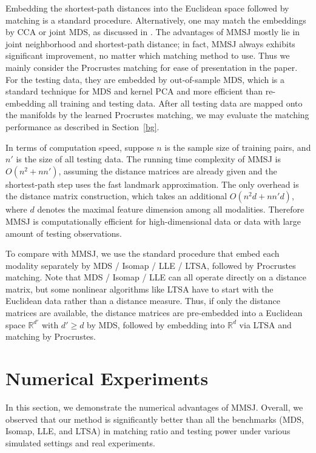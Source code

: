 \documentclass[times,twocolumn,final]{elsarticle}
\begin{document}
Embedding the shortest-path distances into the Euclidean space followed by matching is a standard procedure. Alternatively, one may match the embeddings by CCA or joint MDS, as discussed in \citep{PriebeMarchette2012, FishkindShenPriebe2016}. The advantages of MMSJ mostly lie in joint neighborhood and shortest-path distance; in fact, MMSJ always exhibits significant improvement, no matter which matching method to use. Thus we mainly consider the Procrustes matching for ease of presentation in the paper. For the testing data, they are embedded by out-of-sample MDS, which is a standard technique for MDS and kernel PCA \citep{ScholkopfSmolaMuller1998,BengioEtal2003,TrossetPriebe2008} and more efficient than re-embedding all training and testing data. After all testing data are mapped onto the manifolds by the learned Procrustes matching, we may evaluate the matching performance as described in Section~\ref{bg}.

In terms of computation speed, suppose $n$ is the sample size of training pairs, and $n'$ is the size of all testing data. The running time complexity of MMSJ is $O(n^2+ n n')$, assuming the distance matrices are already given and the shortest-path step uses the fast landmark approximation. The only overhead is the distance matrix construction, which takes an additional $O(n^2 d+ nn' d)$, where $d$ denotes the maximal feature dimension among all modalities. Therefore MMSJ is computationally efficient for high-dimensional data or data with large amount of testing observations.

To compare with MMSJ, we use the standard procedure that embed each modality separately by MDS / Isomap / LLE / LTSA, followed by Procrustes matching. Note that MDS / Isomap / LLE can all operate directly on a distance matrix, but some nonlinear algorithms like LTSA have to start with the Euclidean data rather than a distance measure. Thus, if only the distance matrices are available, the distance matrices are pre-embedded into a Euclidean space $\mathbb{R}^{d'}$ with $d' \geq d$ by MDS, followed by embedding into $\mathbb{R}^{d}$ via LTSA and matching by Procrustes.

\section{Numerical Experiments}
\label{numer}
In this section, we demonstrate the numerical advantages of MMSJ. Overall, we observed that our method is significantly better than all the benchmarks (MDS, Isomap, LLE, and LTSA) in matching ratio and testing power under various simulated settings and real experiments.
\end{document}
